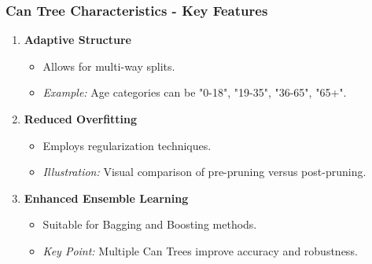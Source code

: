 \documentclass[aspectratio=169]{beamer}
\begin{document}
\begin{frame}[fragile]
    \frametitle{Can Tree Characteristics - Key Features}
    \begin{enumerate}
        \item \textbf{Adaptive Structure}
        \begin{itemize}
            \item Allows for multi-way splits.
            \item \textit{Example:} Age categories can be "0-18", "19-35", "36-65", "65+".
        \end{itemize}

        \item \textbf{Reduced Overfitting}
        \begin{itemize}
            \item Employs regularization techniques.
            \item \textit{Illustration:} Visual comparison of pre-pruning versus post-pruning.
        \end{itemize}
        
        \item \textbf{Enhanced Ensemble Learning}
        \begin{itemize}
            \item Suitable for Bagging and Boosting methods.
            \item \textit{Key Point:} Multiple Can Trees improve accuracy and robustness.
        \end{itemize}
    \end{enumerate}
\end{frame}
\end{document}
